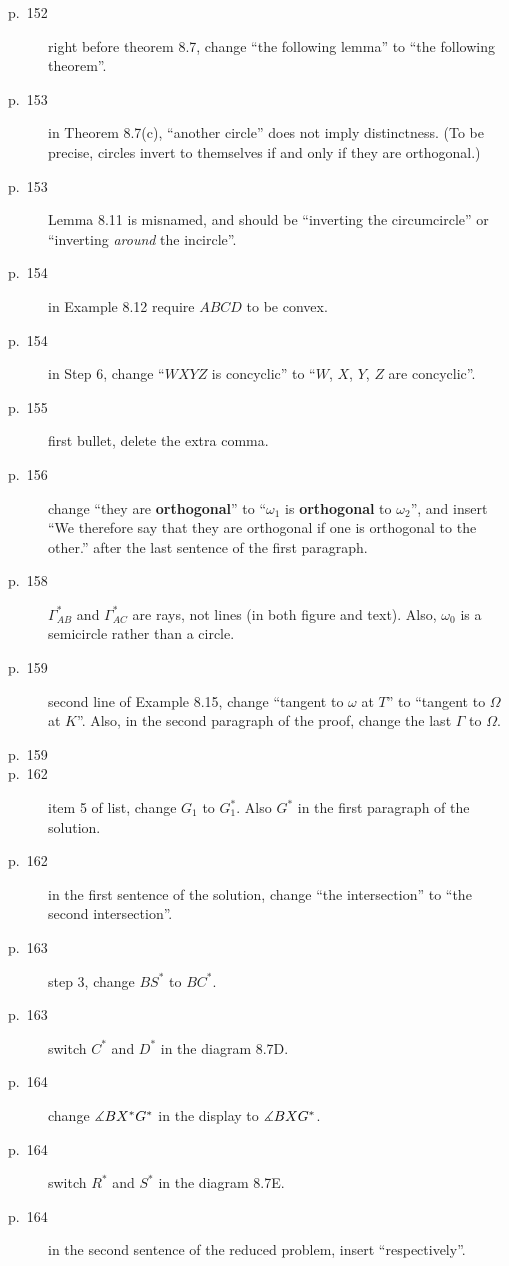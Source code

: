 \documentclass[11pt]{scrartcl}
\begin{document}
\begin{description}
\item[p.\  152] right before theorem 8.7,
  change ``the following lemma'' to ``the following theorem''.
\item[p.\  153] in Theorem 8.7(c), ``another circle'' does not imply distinctness.
  (To be precise, circles invert to themselves if and only if they are orthogonal.)
\item[p.\  153] Lemma 8.11 is misnamed, and should be ``inverting the circumcircle''
  or ``inverting \emph{around} the incircle''.
\item[p.\  154] in Example 8.12 require $ABCD$ to be convex.
\item[p.\  154] in Step 6, change ``$WXYZ$ is concyclic'' to ``$W$, $X$, $Y$, $Z$ are concyclic''.
\item[p.\  155] first bullet, delete the extra comma.
\item[p.\  156] change ``they are \textbf{orthogonal}'' to ``$\omega_1$ is \textbf{orthogonal} to $\omega_2$'',
  and insert ``We therefore say that they are orthogonal if one is orthogonal to the other.'' after the last sentence of the first paragraph.
\item[p.\  158] $\Gamma_{AB}^\ast$ and $\Gamma_{AC}^\ast$ are rays, not lines (in both figure and text).
  Also, $\omega_0$ is a semicircle rather than a circle.
\item[p.\  159] second line of Example 8.15,
  change ``tangent to $\omega$ at $T$'' to ``tangent to $\Omega$ at $K$''.
  Also, in the second paragraph of the proof, change the last $\Gamma$ to $\Omega$.
\item[p.\  159] 
\item[p.\  162] item 5 of list, change $G_1$ to $G_1^\ast$.
  Also $G^\ast$ in the first paragraph of the solution.
\item[p.\  162] in the first sentence of the solution,
  change ``the intersection'' to ``the second intersection''.
\item[p.\  163] step 3, change $BS^\ast$ to $BC^\ast$.
\item[p.\  163] switch $C^\ast$ and $D^\ast$ in the diagram 8.7D.
\item[p.\  164] change $\measuredangle BX^\ast G^\ast$ in the display to $\measuredangle BXG^\ast$.
\item[p.\  164] switch $R^\ast$ and $S^\ast$ in the diagram 8.7E.
\item[p.\  164] in the second sentence of the reduced problem, insert ``respectively''.

\end{description}
\end{document}
